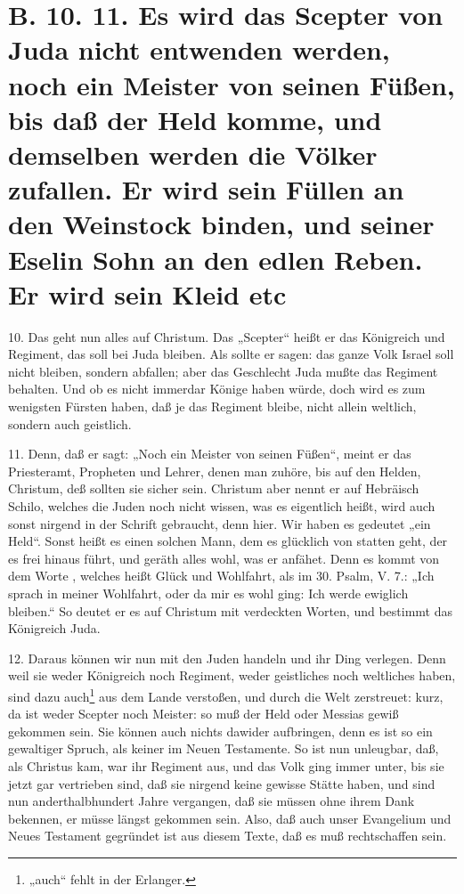 \section[B. 10. 11. Es wird das Scepter von]{B. 10. 11. Es wird das Scepter von Juda nicht entwenden werden, noch ein Meister von seinen Füßen, bis daß der Held komme, und demselben werden die Völker zufallen. Er wird sein Füllen an den Weinstock binden, und seiner Eselin Sohn an den edlen Reben. Er wird sein Kleid etc}

10. Das geht nun alles auf Christum. Das „Scepter“ heißt er das Königreich und Regiment, das soll bei Juda bleiben. Als sollte er sagen: das ganze Volk Israel soll nicht bleiben, sondern abfallen; aber das Geschlecht Juda mußte das Regiment behalten. Und ob es nicht immerdar Könige haben würde, doch wird es zum wenigsten Fürsten haben, daß je das Regiment bleibe, nicht allein weltlich, sondern auch geistlich.

11. Denn, daß er sagt: „Noch ein Meister von seinen Füßen“, meint er das Priesteramt, Propheten und Lehrer, denen man zuhöre, bis auf den Helden, Christum, deß sollten sie sicher sein. Christum aber nennt er auf Hebräisch Schilo, welches die Juden noch nicht wissen, was es eigentlich heißt, wird auch sonst nirgend in der Schrift gebraucht, denn hier. Wir haben es gedeutet „ein Held“. Sonst heißt es einen solchen Mann, dem es glücklich von statten geht, der es frei hinaus führt, und geräth alles wohl, was er anfähet. Denn es kommt von dem Worte , welches heißt Glück und Wohlfahrt, als im 30. Psalm, V. 7.: „Ich sprach in meiner Wohlfahrt, oder da mir es wohl ging: Ich werde ewiglich bleiben.“ So deutet er es auf Christum mit verdeckten Worten, und bestimmt das Königreich Juda.

12. Daraus können wir nun mit den Juden handeln und ihr Ding verlegen. Denn weil sie weder Königreich noch Regiment, weder geistliches noch weltliches haben, sind dazu auch\footnote{„auch“ fehlt in der Erlanger.} aus dem Lande verstoßen, und durch die Welt zerstreuet: kurz, da ist weder Scepter noch Meister: so muß der Held oder Messias gewiß gekommen sein. Sie können auch nichts dawider aufbringen, denn es ist so ein gewaltiger Spruch, als keiner im Neuen Testamente. So ist nun unleugbar, daß, als Christus kam, war ihr Regiment aus, und das Volk ging immer unter, bis sie jetzt gar vertrieben sind, daß sie nirgend keine gewisse Stätte haben, und sind nun anderthalbhundert Jahre vergangen, daß sie müssen ohne ihrem Dank bekennen, er müsse längst gekommen sein. Also, daß auch unser Evangelium und Neues Testament gegründet ist aus diesem Texte, daß es muß rechtschaffen sein.

